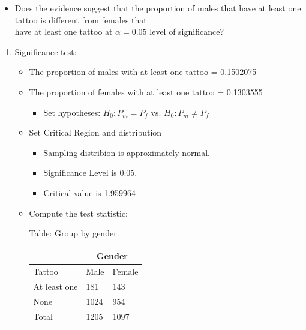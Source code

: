 \documentclass[11pt, chapterprefix=true]{scrbook}\usepackage[]{graphicx}\usepackage[]{color}
\begin{document}
\begin{exercises}
\begin{exercise}
\begin{itemize}

\item Does the evidence suggest that the proportion of males that have at least one tattoo is different from females that \\ have at least one tattoo at $\alpha = 0.05$ level of significance?

\end{itemize}

  \vspace{5mm}

\end{exercise}
\vspace{2mm}
\begin{solution}

  	  \begin{enumerate}
	 \item Significance test:


\begin{itemize}
\item The proportion of males with at least one tattoo = 0.1502075
\item The proportion of females with at least one tattoo = 0.1303555
  \begin{itemize}
  \item Set hypotheses: $H_0: P_m = P_f$ vs. $H_0: P_m \ne P_f$
  \end{itemize}

\item Set Critical Region and distribution

  \begin{itemize}
  \item Sampling distribion is approximately normal.
  \item Significance Level is 0.05.
  \item Critical value is 1.959964
  \end{itemize}

\item Compute the test statistic:

\begin{minipage}[h]{6cm}

Table: Group  by gender.

      \begin{tabular}{@{} p{2.5cm} p{1cm} p{1cm} @{}} \hline %
     &  \multicolumn{2}{c}{Gender } \\ \hline
     Tattoo   & Male & Female \\ \hline
     At least one   & 181 & 143 \\
     None          & 1024 & 954 \\ \hline
     Total        & 1205 & 1097 \\ \hline
   \end{tabular}


\end{minipage}
\end{itemize}
\end{enumerate}
\end{solution}
\end{exercises}
\end{document}

